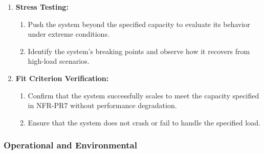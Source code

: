 \documentclass[12pt, titlepage]{article}
\begin{document}
\begin{enumerate}
\begin{enumerate}
    \item \textbf{Stress Testing:}
    \begin{enumerate}
        \item Push the system beyond the specified capacity to evaluate its behavior under extreme conditions.
        \item Identify the system's breaking points and observe how it recovers from high-load scenarios.
    \end{enumerate}
    
    \item \textbf{Fit Criterion Verification:}
    \begin{enumerate}
        \item Confirm that the system successfully scales to meet the capacity specified in NFR-PR7 without performance degradation.
        \item Ensure that the system does not crash or fail to handle the specified load.
    \end{enumerate}

\end{enumerate}
\end{enumerate}





\subsubsection{Operational and Environmental}
\end{document}
